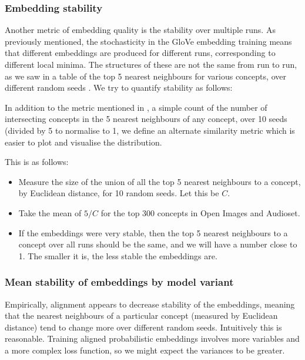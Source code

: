 \subsubsection{Embedding stability}

Another metric of embedding quality is the stability over multiple runs. As previously mentioned, the stochasticity in the GloVe embedding training means that different embeddings are produced for different runs, corresponding to different local minima. The structures of these are not the same from run to run, as we saw in a table of the top 5 nearest neighbours for various concepts, over different random seeds . We try to quantify stability as follows:

In addition to the metric mentioned in \cite{WordEmbeddingStability}, a simple count of the number of intersecting concepts in the 5 nearest neighbours of any concept, over 10 seeds (divided by 5 to normalise to 1, we define an alternate similarity metric which is easier to plot and visualise the distribution. 

This is as follows: 

\begin{itemize}
    \item Measure the size of the union of all the top 5 nearest neighbours to a concept, by Euclidean distance, for 10 random seeds. Let this be $C$. 
    \item Take the mean of $5/C$ for the top 300 concepts in Open Images and Audioset.
    \item If the embeddings were very stable, then the top 5 nearest neighbours to a concept over all runs should be the same, and we will have a number close to 1. The smaller it is, the less stable the embeddings are. 
\end{itemize}

\subsubsection{Mean stability of embeddings by model variant}

Empirically, alignment appears to decrease stability of the embeddings, meaning that the nearest neighbours of a particular concept (measured by Euclidean distance) tend to change more over different random seeds. Intuitively this is reasonable. Training aligned probabilistic embeddings involves more variables and a more complex loss function, so we might expect the variances to be greater. 

